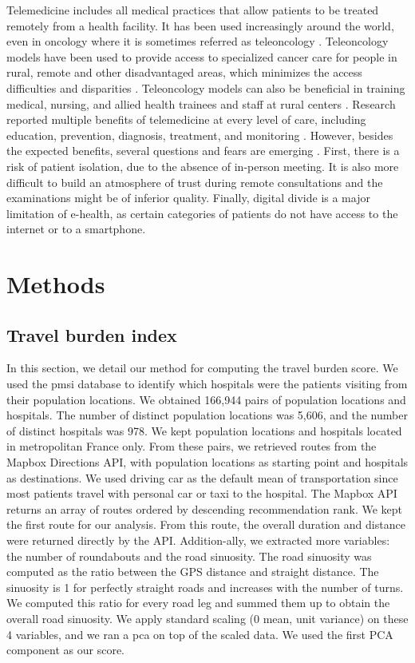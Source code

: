 Telemedicine includes all medical practices that allow patients to be treated remotely from a health facility. It has been used increasingly around the world, even in oncology where it is sometimes referred as teleoncology \cite{mooi_teleoncology_2012,sabesan_are_2014,sabesan_timely_2014,sabesan_medical_2014}. Teleoncology models have been used to provide access to specialized cancer care for people in rural, remote and other disadvantaged areas, which minimizes the access difficulties and disparities \cite{sabesan_telemedicine_2012, sabesan_are_2014}. Teleoncology models can also be beneficial in training medical, nursing, and allied health trainees and staff at rural centers \cite{sabesan_medical_2014}. Research reported multiple benefits of telemedicine at every level of care, including education, prevention, diagnosis, treatment, and monitoring \cite{bertucci_outpatient_2019}. However, besides the expected benefits, several questions and fears are emerging \cite{bertucci_outpatient_2019}. First, there is a risk of patient isolation, due to the absence of in-person meeting. It is also more difficult to build an atmosphere of trust during remote consultations and the examinations might be of inferior quality. Finally, digital divide is a major limitation of e-health, as certain categories of patients do not have access to the internet or to a smartphone.

\section{Methods}

\subsection{Travel burden index}

In this section, we detail our method for computing the travel burden score. We used the \ac{pmsi} database to identify which hospitals were the patients visiting from their population locations. We obtained 166,944 pairs of population locations and hospitals. The number of distinct population locations was 5,606, and the number of distinct hospitals was 978. We kept population locations and hospitals located in metropolitan France only. From these pairs, we retrieved routes from the Mapbox Directions API, with population locations as starting point and hospitals as destinations.  We used driving car as the default mean of transportation since most patients travel with personal car or taxi to the hospital. The Mapbox API returns an array of routes ordered by descending recommendation rank. We kept the first route for our analysis. From this route, the overall duration and distance were returned directly by the API. Addition-ally, we extracted more variables: the number of roundabouts and the road sinuosity. The road sinuosity was computed as the ratio between the GPS distance and straight distance. The sinuosity is 1 for perfectly straight roads and increases with the number of turns. We computed this ratio for every road leg and summed them up to obtain the overall road sinuosity. We apply standard scaling (0 mean, unit variance) on these 4 variables, and we ran a \ac{pca} on top of the scaled data. We used the first PCA component as our score.

